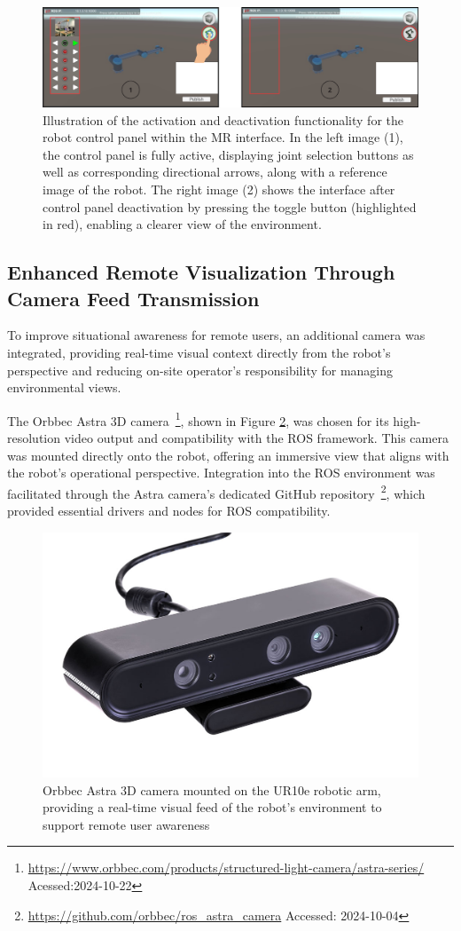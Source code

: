 \begin{figure}[h]
    \centering
    \includegraphics[width=\linewidth]{figs/mao-toca-ui-refeita-numbers.png}
    \caption{Illustration of the activation and deactivation functionality for the robot control panel within the \ac{MR} interface. In the left image (1), the control panel is fully active, displaying joint selection buttons as well as corresponding directional arrows, along with a reference image of the robot. The right image (2) shows the interface after control panel deactivation by pressing the toggle button (highlighted in red), enabling a clearer view of the environment.}
    \label{fig:menu-toggle-button}
\end{figure}



\subsection{Enhanced Remote Visualization Through Camera Feed Transmission}

To improve situational awareness for remote users, an additional camera was integrated, providing real-time visual context directly from the robot’s perspective and reducing on-site operator's responsibility for managing environmental views.

The Orbbec Astra 3D camera~\footnote{\url{https://www.orbbec.com/products/structured-light-camera/astra-series/} Acessed:2024-10-22}, shown in Figure \ref{fig:astra-camera}, was chosen for its high-resolution video output and compatibility with the \ac{ROS} framework. This camera was mounted directly onto the robot, offering an immersive view that aligns with the robot’s operational perspective. Integration into the \ac{ROS} environment was facilitated through the Astra camera’s dedicated GitHub repository~\footnote{\url{https://github.com/orbbec/ros\_astra\_camera} Accessed: 2024-10-04}, which provided essential drivers and nodes for \ac{ROS} compatibility.

\begin{figure}[h]
    \centering
    \includegraphics[width=0.5\linewidth]{figs/AstraSeries_3.jpg}
    \caption{Orbbec Astra 3D camera mounted on the UR10e robotic arm, providing a real-time visual feed of the robot's environment to support remote user awareness}
    \label{fig:astra-camera}
\end{figure}

